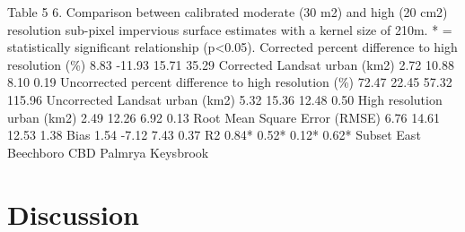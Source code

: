 \documentclass[]{book}
\begin{document}
Table 5 6. Comparison between calibrated moderate (30 m2) and high (20
cm2) resolution sub-pixel impervious surface estimates with a kernel
size of 210m. * = statistically significant relationship
(p\textless{}0.05). Corrected percent difference to high resolution (\%)
8.83 -11.93 15.71 35.29 Corrected Landsat urban (km2) 2.72 10.88 8.10
0.19 Uncorrected percent difference to high resolution (\%) 72.47 22.45
57.32 115.96 Uncorrected Landsat urban (km2) 5.32 15.36 12.48 0.50 High
resolution urban (km2) 2.49 12.26 6.92 0.13 Root Mean Square Error
(RMSE) 6.76 14.61 12.53 1.38 Bias 1.54 -7.12 7.43 0.37 R2 0.84* 0.52*
0.12* 0.62* Subset East Beechboro CBD Palmrya Keysbrook

\section{Discussion}\label{discussion-1}
\end{document}
